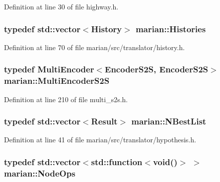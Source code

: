 Definition at line 30 of file highway.\+h.

\subsubsection[{\texorpdfstring{Histories}{Histories}}]{\setlength{\rightskip}{0pt plus 5cm}typedef std\+::vector$<${\bf History}$>$ {\bf marian\+::\+Histories}}\hypertarget{namespacemarian_a805aaffc4cae6d189e6a22d2a14cca84}{}\label{namespacemarian_a805aaffc4cae6d189e6a22d2a14cca84}


Definition at line 70 of file marian/src/translator/history.\+h.

\subsubsection[{\texorpdfstring{Multi\+Encoder\+S2S}{MultiEncoderS2S}}]{\setlength{\rightskip}{0pt plus 5cm}typedef {\bf Multi\+Encoder}$<${\bf Encoder\+S2S}, {\bf Encoder\+S2S}$>$ {\bf marian\+::\+Multi\+Encoder\+S2S}}\hypertarget{namespacemarian_ae5c33c87d5d69701dccd48b503ec7d6a}{}\label{namespacemarian_ae5c33c87d5d69701dccd48b503ec7d6a}


Definition at line 210 of file multi\+\_\+s2s.\+h.

\subsubsection[{\texorpdfstring{N\+Best\+List}{NBestList}}]{\setlength{\rightskip}{0pt plus 5cm}typedef std\+::vector$<${\bf Result}$>$ {\bf marian\+::\+N\+Best\+List}}\hypertarget{namespacemarian_aaae4a49bda201e73a4671babdb7df6b8}{}\label{namespacemarian_aaae4a49bda201e73a4671babdb7df6b8}


Definition at line 41 of file marian/src/translator/hypothesis.\+h.

\subsubsection[{\texorpdfstring{Node\+Ops}{NodeOps}}]{\setlength{\rightskip}{0pt plus 5cm}typedef std\+::vector$<$std\+::function$<$void()$>$ $>$ {\bf marian\+::\+Node\+Ops}}\hypertarget{namespacemarian_a4956376218cc236016c20bc4071470da}{}\label{namespacemarian_a4956376218cc236016c20bc4071470da}


